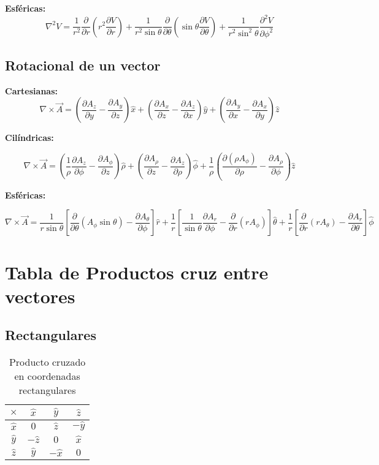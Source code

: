 \documentclass[11pt]{article}
\begin{document}
\textbf{Esféricas:}
\begin{equation}
    \nabla^2 V = \frac{1}{r^2} \frac{\partial}{\partial r} \left( r^2 \frac{\partial V}{\partial r} \right) + \frac{1}{r^2 \sin \theta} \frac{\partial}{\partial \theta} \left( \sin \theta \frac{\partial V}{\partial \theta} \right) + \frac{1}{r^2 \sin^2 \theta} \frac{\partial^2 V}{\partial \phi^2}
\end{equation}

\subsection{Rotacional de un vector}

\textbf{Cartesianas:}
\[
\nabla \times \vec{A} =
\left( \frac{\partial A_z}{\partial y} - \frac{\partial A_y}{\partial z} \right) \hat{x}
+ \left( \frac{\partial A_x}{\partial z} - \frac{\partial A_z}{\partial x} \right) \hat{y}
+ \left( \frac{\partial A_y}{\partial x} - \frac{\partial A_x}{\partial y} \right) \hat{z}
\]


\textbf{Cilíndricas:}

\[
\nabla \times \vec{A} =
\left( \frac{1}{\rho} \frac{\partial A_z}{\partial \phi} - \frac{\partial A_\phi}{\partial z} \right) \hat{\rho}
+ \left( \frac{\partial A_\rho}{\partial z} - \frac{\partial A_z}{\partial \rho} \right) \hat{\phi}
+ \frac{1}{\rho} \left( \frac{\partial (\rho A_\phi)}{\partial \rho} - \frac{\partial A_\rho}{\partial \phi} \right) \hat{z}
\]



\textbf{Esféricas:}

\[
\nabla \times \vec{A} =
\frac{1}{r \sin\theta}
\left[
\frac{\partial}{\partial \theta} (A_\phi \sin\theta) - \frac{\partial A_\theta}{\partial \phi}
\right] \hat{r}
+ \frac{1}{r}
\left[
\frac{1}{\sin\theta} \frac{\partial A_r}{\partial \phi} - \frac{\partial}{\partial r}(r A_\phi)
\right] \hat{\theta}
+ \frac{1}{r}
\left[
\frac{\partial}{\partial r}(r A_\theta) - \frac{\partial A_r}{\partial \theta}
\right] \hat{\phi}
\]


\section{Tabla de Productos cruz entre vectores}
\subsection{Rectangulares}
\begin{table}[H]
\centering
\begin{tabular}{c|ccc}
$\times$ & $\hat{x}$ & $\hat{y}$ & $\hat{z}$ \\
\hline
$\hat{x}$ & $0$ & $\hat{z}$ & $-\hat{y}$ \\
$\hat{y}$ & $-\hat{z}$ & $0$ & $\hat{x}$ \\
$\hat{z}$ & $\hat{y}$ & $-\hat{x}$ & $0$
\end{tabular}
\caption{Producto cruzado en coordenadas rectangulares}
\end{table}
\end{document}
